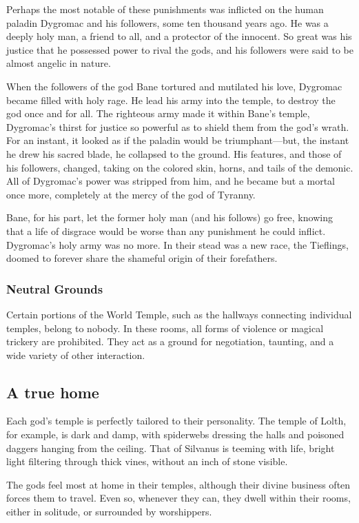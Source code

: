 Perhaps the most notable of these punishments was inflicted on the human paladin Dygromac and his followers, some ten thousand years ago.
He was a deeply holy man, a friend to all, and a protector of the innocent.
So great was his justice that he possessed power to rival the gods, and his followers were said to be almost angelic in nature.

When the followers of the god Bane tortured and mutilated his love, Dygromac became filled with holy rage.
He lead his army into the temple, to destroy the god once and for all.
The righteous army made it within Bane's temple, Dygromac's thirst for justice so powerful as to shield them from the god's wrath.
For an instant, it looked as if the paladin would be triumphant---but, the instant he drew his sacred blade, he collapsed to the ground.
His features, and those of his followers, changed, taking on the colored skin, horns, and tails of the demonic.
All of Dygromac's power was stripped from him, and he became but a mortal once more, completely at the mercy of the god of Tyranny.

Bane, for his part, let the former holy man (and his follows) go free, knowing that a life of disgrace would be worse than any punishment he could inflict.
Dygromac's holy army was no more.
In their stead was a new race, the Tieflings, doomed to forever share the shameful origin of their forefathers.

\subsubsection{Neutral Grounds}
Certain portions of the World Temple, such as the hallways connecting individual temples, belong to nobody.
In these rooms, all forms of violence or magical trickery are prohibited.
They act as a ground for negotiation, taunting, and a wide variety of other interaction. 

\subsection{A true home}
Each god's temple is perfectly tailored to their personality.
The temple of Lolth, for example, is dark and damp, with spiderwebs dressing the halls and poisoned daggers hanging from the ceiling.
That of Silvanus is teeming with life, bright light filtering through thick vines, without an inch of stone visible.

The gods feel most at home in their temples, although their divine business often forces them to travel.
Even so, whenever they can, they dwell within their rooms, either in solitude, or surrounded by worshippers.

